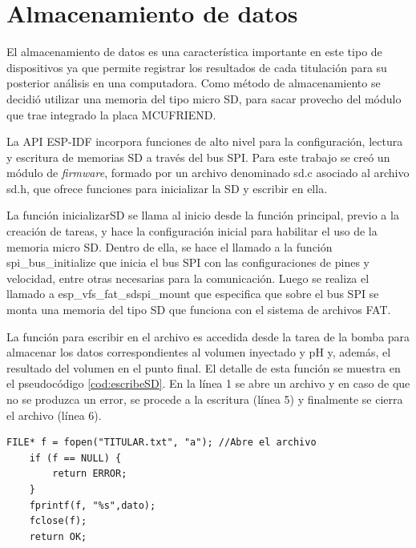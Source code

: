 \section{Almacenamiento de datos}

El almacenamiento de datos es una característica importante en este tipo de dispositivos ya que permite registrar los resultados de cada titulación para su posterior análisis en una computadora. Como método de almacenamiento se decidió utilizar una memoria del tipo micro SD, para sacar provecho del módulo que trae integrado la placa MCUFRIEND.

La API ESP-IDF incorpora funciones de alto nivel para la configuración, lectura y escritura de memorias SD a través del bus SPI. Para este trabajo se creó un módulo de \textit{firmware}, formado por un archivo denominado sd.c asociado al archivo sd.h, que ofrece funciones para inicializar la SD y escribir en ella.

La función inicializarSD se llama al inicio desde la función principal, previo a la creación de tareas, y hace la configuración inicial para habilitar el uso de la memoria micro SD. Dentro de ella, se hace el llamado a  la función spi\_bus\_initialize que inicia el bus SPI con las configuraciones de pines y velocidad, entre otras necesarias para la comunicación. Luego se realiza el llamado a esp\_vfs\_fat\_sdspi\_mount que especifica que sobre el bus SPI se monta una memoria del tipo SD que funciona con el sistema de archivos FAT.

La función para escribir en el archivo es accedida desde la tarea de la bomba para almacenar los datos correspondientes al volumen inyectado y pH y, además, el resultado del volumen en el punto final. El detalle de esta función se muestra en el pseudocódigo \ref{cod:escribeSD}. En la línea 1 se abre un archivo y en caso de que no se produzca un error, se procede a la escritura (línea 5) y finalmente se cierra el archivo (línea 6).

\begin{lstlisting}[label=cod:escribeSD,caption=Pseudocódigo de la función que escribe en la memoria SD.]
    FILE* f = fopen("TITULAR.txt", "a"); //Abre el archivo
    if (f == NULL) {
        return ERROR;
    }
    fprintf(f, "%s",dato);
    fclose(f);
    return OK;
\end{lstlisting}


